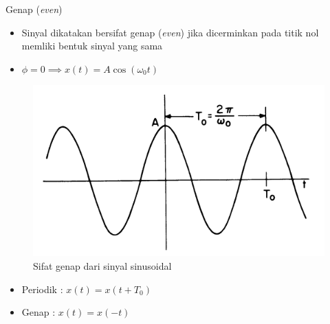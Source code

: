 \documentclass[aspectratio=169]{beamer}
\begin{document}
\begin{frame}{Genap (\textit{even})}
	\begin{itemize}
		\item Sinyal dikatakan bersifat genap (\textit{even}) jika dicerminkan pada titik nol memliki bentuk sinyal yang sama
		\item $ \phi = 0 \implies x(t) = A \cos(\omega_0 t) $	
	\end{itemize}
	\begin{figure}
		\centering
		\includegraphics[height=0.4\textheight]{gambar/01.sinyal_genap}
		\caption{Sifat genap dari sinyal sinusoidal}
	\end{figure}
	\begin{itemize}
		\item Periodik : $ x(t) = x(t + T_0) $
		\item Genap : $ x(t) = x(-t) $
	\end{itemize}
\end{frame}
\end{document}
